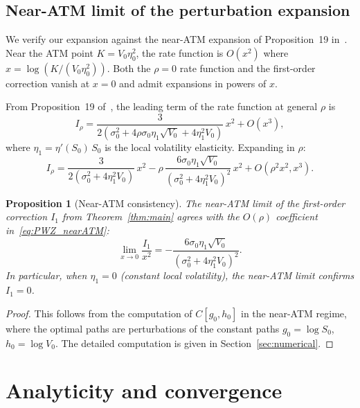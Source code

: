 \documentclass[11pt]{article}
\newtheorem{proposition}[theorem]{Proposition}
\theoremstyle{definition}
\begin{document}
\subsection{Near-ATM limit of the perturbation expansion}\label{sec:near_ATM}

We verify our expansion against the near-ATM expansion of Proposition~19 in~\cite{PWZ2025}. Near the ATM point $K = V_0\eta_0^2$, the rate function is $O(x^2)$ where $x = \log(K/(V_0\eta_0^2))$. Both the $\rho = 0$ rate function and the first-order correction vanish at $x = 0$ and admit expansions in powers of $x$.

From Proposition~19 of~\cite{PWZ2025}, the leading term of the rate function at general $\rho$ is
\begin{equation}\label{eq:PWZ_nearATM}
  I_\rho = \frac{3}{2(\sigma_0^2 + 4\rho\sigma_0\eta_1\sqrt{V_0} + 4\eta_1^2 V_0)}\,x^2 + O(x^3),
\end{equation}
where $\eta_1 = \eta'(S_0)\,S_0$ is the local volatility elasticity. Expanding in $\rho$:
\begin{equation}
  I_\rho = \frac{3}{2(\sigma_0^2 + 4\eta_1^2 V_0)}\,x^2 - \rho\,\frac{6\sigma_0\eta_1\sqrt{V_0}}{(\sigma_0^2 + 4\eta_1^2 V_0)^2}\,x^2 + O(\rho^2 x^2, x^3).
\end{equation}

\begin{proposition}[Near-ATM consistency]\label{prop:nearATM}
The near-ATM limit of the first-order correction $I_1$ from Theorem~\ref{thm:main} agrees with the $O(\rho)$ coefficient in~\eqref{eq:PWZ_nearATM}:
\begin{equation}
  \lim_{x \to 0} \frac{I_1}{x^2} = -\frac{6\sigma_0\eta_1\sqrt{V_0}}{(\sigma_0^2 + 4\eta_1^2 V_0)^2}.
\end{equation}
In particular, when $\eta_1 = 0$ (constant local volatility), the near-ATM limit confirms $I_1 = 0$.
\end{proposition}

\begin{proof}
This follows from the computation of $C[g_0, h_0]$ in the near-ATM regime, where the optimal paths are perturbations of the constant paths $g_0 = \log S_0$, $h_0 = \log V_0$. The detailed computation is given in Section~\ref{sec:numerical}.
\end{proof}

\section{Analyticity and convergence}\label{sec:analyticity}
\end{document}
